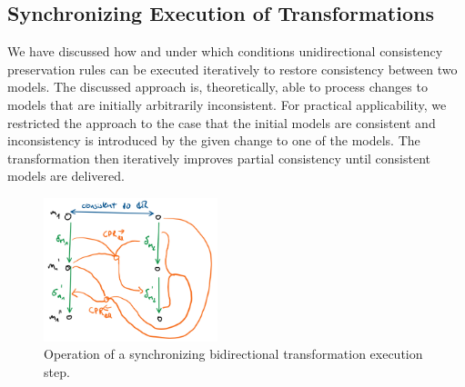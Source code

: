 


\subsection{Synchronizing Execution of Transformations}
\label{chap:synchronization:bidirectional:execution}

We have discussed how and under which conditions unidirectional consistency preservation rules can be executed iteratively to restore consistency between two models.
The discussed approach is, theoretically, able to process changes to models that are initially arbitrarily inconsistent.
For practical applicability, we restricted the approach to the case that the initial models are consistent and inconsistency is introduced by the given change to one of the models.
The transformation then iteratively improves partial consistency until consistent models are delivered.

\begin{figure}
    \centering
    \includegraphics[width=0.45\textwidth]{figures/correctness/synchronization/synchronizing_execution_step.png}    
    \caption[Synchronizing bidirectional transformation execution step]{Operation of a synchronizing bidirectional transformation execution step.}
    \label{fig:synchronization:synchronizing_execution_step}
\end{figure}

